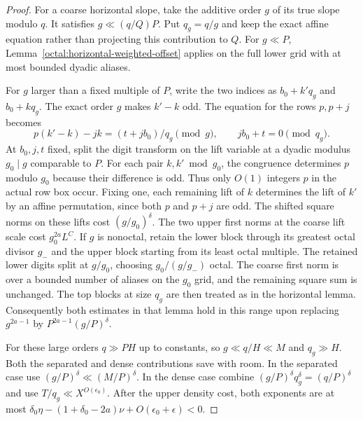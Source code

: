 \documentclass[11pt,a4paper]{article}
\theoremstyle{paperplain}
\numberwithin{equation}{section}
\begin{document}
\begin{proof}
For a coarse horizontal slope, take the additive order $g$
of its true slope modulo $q$. It satisfies $g\ll(q/Q)P$.
Put $q_g=q/g$ and keep the exact affine equation rather than
projecting this contribution to $Q$. For $g\ll P$,
Lemma~\ref{octal:horizontal-weighted-offset} applies on the
full lower grid with at most bounded dyadic aliases.

For $g$ larger than a fixed multiple of $P$, write the two
indices as $b_0+k' q_g$ and $b_0+k q_g$. The exact order $g$
makes $k'-k$ odd. The equation for the rows $p,p+j$ becomes
\begin{equation}\label{eq:near-balanced-affine-true-order}
      p(k'-k)-j k=(t+j b_0)/q_g\pmod g,
               \qquad jb_0+t=0\pmod{q_g}.
\end{equation}
At $b_0,j,t$ fixed, split the digit transform on the lift
variable at a dyadic modulus $g_0\mid g$ comparable to $P$.
For each pair $k,k'\bmod g_0$, the congruence determines $p$
modulo $g_0$ because their difference is odd. Thus only
$O(1)$ integers $p$ in the actual row box occur. Fixing one,
each remaining lift of $k$ determines the lift of $k'$ by
an affine permutation, since both $p$ and $p+j$ are odd.
The shifted square norms on these lifts cost $(g/g_0)^\delta$.
The two upper first norms at the coarse lift scale cost
$g_0^{2a}L^C$. If $g$ is nonoctal, retain the lower block
through its greatest octal divisor $g_-$ and the upper block
starting from its least octal multiple. The retained lower
digits split at $g/g_0$, choosing $g_0/(g/g_-)$ octal.
The coarse first norm is over a bounded number of aliases
on the $g_0$ grid, and the remaining square sum is unchanged.
The top blocks at size $q_g$ are then treated as in the
horizontal lemma. Consequently both estimates in that lemma
hold in this range upon replacing $g^{2a-1}$ by
$P^{2a-1}(g/P)^\delta$.

For these large orders $q\gg PH$ up to constants, so
$g\ll q/H\ll M$ and $q_g\gg H$. Both the separated and
dense contributions save with room. In the separated case
use $(g/P)^\delta\ll(M/P)^\delta$. In the dense case
combine $(g/P)^\delta q_g^\delta=(q/P)^\delta$ and use
$T/q_g\ll X^{O(\epsilon_0)}$. After the upper density cost,
both exponents are at most
$\delta_0\eta-(1+\delta_0-2a)\nu+O(\epsilon_0+\epsilon)<0$.


\end{proof}
\end{document}
